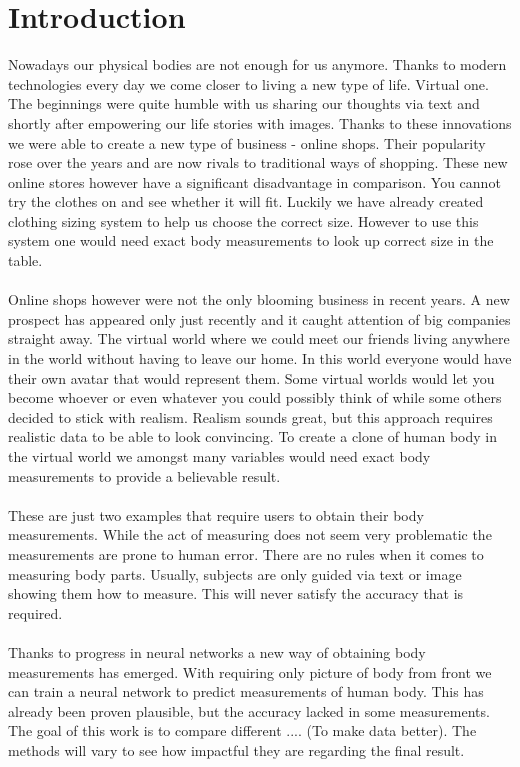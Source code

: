 \chapter*{Introduction}
Nowadays our physical bodies are not enough for us anymore. Thanks to modern technologies every day we come closer to living a new type of life. Virtual one. The beginnings were quite humble with us sharing our thoughts via text and shortly after empowering our life stories with images. Thanks to these innovations we were able to create a new type of business - online shops. Their popularity rose over the years and are now rivals to traditional ways of shopping. These new online stores however have a significant disadvantage in comparison. You cannot try the clothes on and see whether it will fit. Luckily we have already created clothing sizing system to help us choose the correct size. However to use this system one would need exact body measurements to look up correct size in the table. \\ \\
Online shops however were not the only blooming business in recent years. A new prospect has appeared only just recently and it caught attention of big companies straight away. The virtual world where we could meet our friends living anywhere in the world without having to leave our home. In this world everyone would have their own avatar that would represent them. Some virtual worlds would let you become whoever or even whatever you could possibly think of while some others decided to stick with realism. Realism sounds great, but this approach requires realistic data to be able to look convincing. To create a clone of human body in the virtual world we amongst many variables would need exact body measurements to provide a believable result.\\ \\
These are just two examples that require users to obtain their body measurements. While the act of measuring does not seem very problematic the measurements are prone to human error. There are no rules when it comes to measuring body parts. Usually, subjects are only guided via text or image showing them how to measure. This will never satisfy the accuracy that is required.\\ \\
Thanks to progress in neural networks a new way of obtaining body measurements has emerged. With requiring only picture of body from front we can train a neural network to predict measurements of human body. This has already been proven plausible, but the accuracy lacked in some measurements. The goal of this work is to compare different .... (To make data better). The methods will vary to see how impactful they are regarding the final result.\\\\
